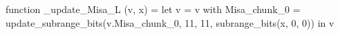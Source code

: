 function _update_Misa_L (v, x) = let v = { v with Misa_chunk_0 = update_subrange_bits(v.Misa_chunk_0, 11, 11, subrange_bits(x, 0, 0)) } in
  v
